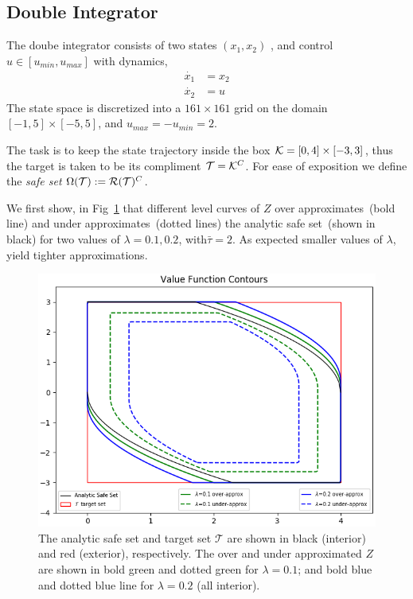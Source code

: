 \subsection{Double Integrator}
The doube integrator consists of two states $(x_1, x_2)$ , and  control $u \in [u_{min}, u_{max}]$ with dynamics,
\begin{equation}
\begin{split}
\dot{x_1} & = x_2 \\
\dot{x_2} & = u 
\end{split}
\end{equation}
\noindent The state space is discretized into a $161 \times 161$ grid on the domain $[-1,5] \times [-5,5]$, and $u_{max}=-u_{min}=2$.

The task is to keep the state trajectory inside the box $\mathcal{K} = [0,4] \times [-3,3]$, thus the target is taken to be its compliment $\mathcal{T}=\mathcal{K}^C$. For ease of exposition we define the \emph{safe set} $\Omega(\mathcal{T}) := \mathcal{R}(\mathcal{T})^C$.

We first show, in Fig~\ref{fig:convergence} that different level curves of $Z$ over approximates~(bold line) and under approximates~(dotted lines) the analytic safe set~(shown in black) for two values of $\lambda = 0.1, 0.2$, with$\bar{\tau}=2$. As expected smaller values of $\lambda$, yield tighter approximations. 

\begin{figure}
\includegraphics[scale=0.5]{convergence_difflambda.png}
\caption{The analytic safe set and target set $\mathcal{T}$ are shown in black (interior) and red (exterior), respectively. The over and under approximated $Z$ are shown in bold green and dotted green for $\lambda=0.1$; and bold blue and dotted blue line for $\lambda  = 0.2$ (all interior).}
\label{fig:convergence}
\end{figure}

